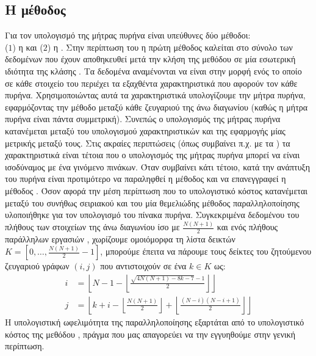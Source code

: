 \subsection{Η μέθοδος \texttt{}}
Για τον υπολογισμό της μήτρας πυρήνα είναι υπεύθυνες δύο μέθοδοι:\\ ($1$) η \texttt{} και ($2$) η \texttt{}.
Στην περίπτωση του \texttt{} η πρώτη μέθοδος καλείται στο σύνολο των δεδομένων που έχουν αποθηκευθεί μετά την κλήση της μεθόδου \texttt{} σε μία εσωτερική ιδιότητα της κλάσης \texttt{}.
Τα δεδομένα αναμένονται να είναι στην μορφή ενός \texttt{} το οποίο σε κάθε στοιχείο του περιέχει τα εξαχθέντα χαρακτηριστικά που αφορούν τον κάθε πυρήνα.
Χρησιμοποιώντας αυτά τα χαρακτηριστικά υπολογίζουμε την μήτρα πυρήνα, εφαρμόζοντας την μέθοδο \texttt{} μεταξύ κάθε ζευγαριού της άνω διαγωνίου (καθώς η μήτρα πυρήνα είναι πάντα συμμετρική).
Συνεπώς ο υπολογισμός της μήτρας πυρήνα κατανέμεται μεταξύ του υπολογισμού χαρακτηριστικών και της εφαρμογής μίας μετρικής μεταξύ τους.
Στις ακραίες περιπτώσεις (όπως συμβαίνει π.χ. με τα ) τα χαρακτηριστικά είναι τέτοια που ο υπολογισμός της μήτρας πυρήνα μπορεί να είναι ισοδύναμος με ένα γινόμενο πινάκων.
Όταν συμβαίνει κάτι τέτοιο, κατά την ανάπτυξη του πυρήνα είναι προτιμότερο να παραληφθεί η μέθοδος \texttt{} και να επανεγγραφεί η μέθοδος \texttt{}.
Όσον αφορά την μέση περίπτωση που το υπολογιστικό κόστος κατανέμεται μεταξύ του συνήθως σειριακού \texttt{} και του \texttt{} μία θεμελιώδης μέθοδος παραλληλοποίησης υλοποιήθηκε για τον υπολογισμό του πίνακα πυρήνα.
Συγκεκριμένα δεδομένου του πλήθους των στοιχείων της άνω διαγωνίου ίσο με $\frac{N(N+1)}{2}$ και ενός πλήθους παράλληλων εργασιών \texttt{}, χωρίζουμε ομοιόμορφα τη λίστα δεικτών $K = [0, \dots, \frac{N(N+1)}{2}-1]$, μπορούμε έπειτα να πάρουμε τους δείκτες του ζητούμενου ζευγαριού γράφων $(i,j)$ που αντιστοιχούν σε ένα $k \in K$ ως:
\begin{align}
    i &= \left\lfloor N - 1 - \left\lfloor \frac{\sqrt{4N(N+1) - 8k - 7} - 1}{2}\right\rfloor \right\rfloor\\
    j &= \left\lfloor k + i - \left\lfloor \frac{N(N+1)}{2} \right\rfloor + \left\lfloor \frac{(N-i)(N-i+1)}{2} \right\rfloor \right\rfloor
\end{align}
Η υπολογιστική ωφελιμότητα της παραλληλοποίησης εξαρτάται από το υπολογιστικό κόστος της μεθόδου \texttt{}, πράγμα που μας απαγορεύει να την εγγυηθούμε στην γενική περίπτωση.


